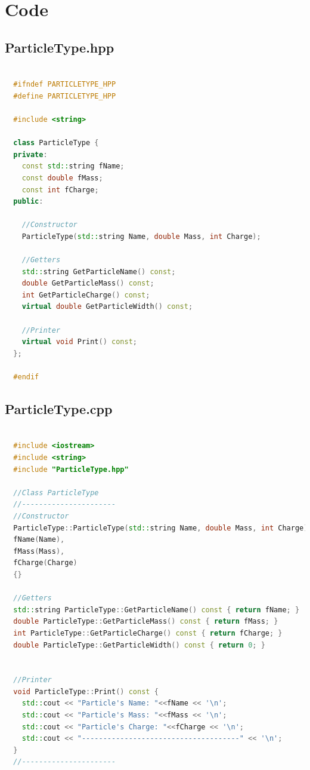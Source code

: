 \documentclass[a4paper, 11pt]{article}
\begin{document}
    \section*{Code}
      \subsection{ParticleType.hpp}

        \begin{lstlisting}[language=c++, style=code]

  #ifndef PARTICLETYPE_HPP
  #define PARTICLETYPE_HPP

  #include <string>

  class ParticleType {
  private:
    const std::string fName;
    const double fMass;
    const int fCharge;
  public:

    //Constructor
    ParticleType(std::string Name, double Mass, int Charge);

    //Getters
    std::string GetParticleName() const;
    double GetParticleMass() const;
    int GetParticleCharge() const;
    virtual double GetParticleWidth() const;

    //Printer
    virtual void Print() const;
  };

  #endif
        \end{lstlisting}
      \subsection{ParticleType.cpp}
        \begin{lstlisting}[language=c++, style=code]

  #include <iostream>
  #include <string>
  #include "ParticleType.hpp"

  //Class ParticleType
  //----------------------
  //Constructor
  ParticleType::ParticleType(std::string Name, double Mass, int Charge):
  fName(Name),
  fMass(Mass),
  fCharge(Charge)
  {}

  //Getters
  std::string ParticleType::GetParticleName() const { return fName; }
  double ParticleType::GetParticleMass() const { return fMass; }
  int ParticleType::GetParticleCharge() const { return fCharge; }
  double ParticleType::GetParticleWidth() const { return 0; }


  //Printer
  void ParticleType::Print() const {
    std::cout << "Particle's Name: "<<fName << '\n';
    std::cout << "Particle's Mass: "<<fMass << '\n';
    std::cout << "Particle's Charge: "<<fCharge << '\n';
    std::cout << "-------------------------------------" << '\n';
  }
  //----------------------
        \end{lstlisting}
\end{document}
